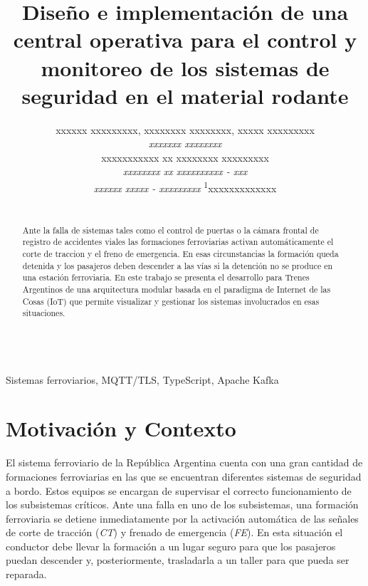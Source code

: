 \documentclass[a4paper]{IEEEtran}
\begin{document}
\title{Diseño e implementación de una central operativa para el control y monitoreo de los sistemas de seguridad en el material rodante}



\author{

xxxxxx xxxxxxxxx, 
xxxxxxxx xxxxxxxx, 
xxxxx xxxxxxxxx \\

\normalsize \textit{xxxxxxx xxxxxxxx} \\
xxxxxxxxxxx xx xxxxxxxx xxxxxxxxx \\
\textit{xxxxxxxx xx xxxxxxxxxx - xxx} \\
\textit{xxxxxx xxxxx - xxxxxxxxx}
\textsuperscript{1}\small xxxxxxxxxxxxx \\

}


\maketitle

\begin{abstract}
\\
Ante la falla de sistemas tales como el control de puertas o la cámara frontal de registro de accidentes viales las formaciones ferroviarias activan automáticamente el corte de traccion y el freno de emergencia. En esas circunstancias la formación queda detenida y los pasajeros deben descender a las vías si la detención no se produce en una estación ferroviaria. En este trabajo se presenta el desarrollo para Trenes Argentinos de una arquitectura modular basada en el paradigma de Internet de las Cosas (IoT) que permite visualizar y gestionar los sistemas involucrados en esas situaciones.
\end{abstract}


\begin{IEEEkeywords}
\\
Sistemas ferroviarios, MQTT/TLS, TypeScript, Apache Kafka
\end{IEEEkeywords}


\section{Motivación y Contexto}

El sistema ferroviario de la República Argentina cuenta con una gran cantidad de formaciones ferroviarias en las que se encuentran diferentes sistemas de seguridad a bordo. Estos equipos se encargan de supervisar el correcto funcionamiento de los subsistemas críticos. Ante una falla en uno de los subsistemas, una formación ferroviaria se detiene inmediatamente por la activación automática de las señales de corte de tracción (\textit{CT}) y frenado de emergencia (\textit{FE}). En esta situación el conductor debe llevar la formación a un lugar seguro para que los pasajeros puedan descender y, posteriormente, trasladarla a un taller para que pueda ser reparada.
\end{document}
